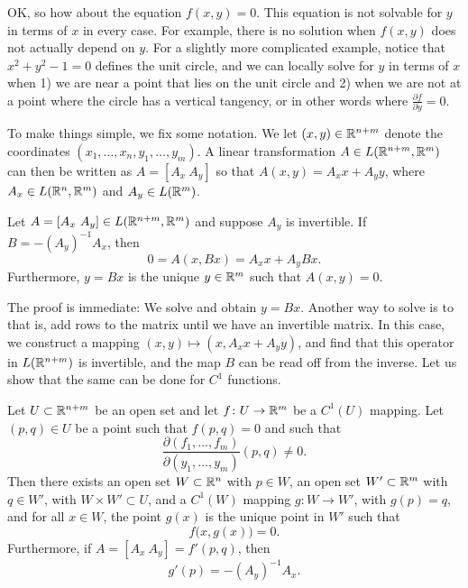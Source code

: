 OK\@, so how about the equation $f(x,y) = 0$.  This equation is
not solvable for $y$ in terms of $x$ in every case.  For example,
there is no solution
when $f(x,y)$ does not actually depend on $y$.  For a slightly more
complicated example, notice that $x^2+y^2-1 = 0$ defines the unit circle, and
we can locally solve for $y$ in terms of $x$ when 1) we are near
a point that lies on the unit circle and 2) when we are not at a point
where the circle has a vertical tangency, or in other words where
$\frac{\partial f}{\partial y} = 0$.

To make things simple, we fix some notation.  We let $(x,y) \in
{\mathbb{R}}^{n+m}$ denote the coordinates $(x_1,\ldots,x_n,y_1,\ldots,y_m)$.  A
linear transformation $A \in L({\mathbb{R}}^{n+m},{\mathbb{R}}^m)$ can then 
be written as
$A = [ A_x ~ A_y ]$ so that $A(x,y) = A_x x + A_y y$,
where $A_x \in L({\mathbb{R}}^n,{\mathbb{R}}^m)$ and
$A_y \in L({\mathbb{R}}^m)$.

\begin{prop}
Let $A = [A_x~A_y] \in L({\mathbb{R}}^{n+m},{\mathbb{R}}^m)$ and suppose 
$A_y$ is invertible.  If $B = - {(A_y)}^{-1} A_x$, then
\begin{equation*}
0 = A ( x, Bx) = A_x x + A_y Bx .
\end{equation*}
Furthermore, $y=Bx$ is the unique $y \in {\mathbb{R}}^m$ such that $A(x,y) = 0$.
\end{prop}

The proof is immediate: We solve and obtain $y = Bx$.
Another way to solve is to  that is, add
rows to the matrix until we have an invertible matrix.  In this case,
we construct a mapping $(x,y) \mapsto (x,A_x x + A_y y)$, and
find that this operator in $L({\mathbb{R}}^{n+m})$ is invertible, and the map $B$
can be read off from the inverse.
Let us show that the same can be done for $C^1$ functions.

\begin{thm}
\label{thm:implicit}
Let $U \subset {\mathbb{R}}^{n+m}$ be an open set and let $f \colon U \to {\mathbb{R}}^m$
be a $C^1(U)$ mapping.  Let $(p,q) \in U$ be a point such that
$f(p,q) = 0$ and such that
\begin{equation*}
\frac{\partial(f_1,\ldots,f_m)}{\partial(y_1,\ldots,y_m)} (p,q)  \neq 0 .
\end{equation*}
Then there exists an
open set $W \subset {\mathbb{R}}^n$ with $p \in W$,
an open set $W' \subset {\mathbb{R}}^m$ with $q \in W'$,
with $W \times W' \subset U$,
and
a $C^1(W)$ mapping $g \colon W \to W'$, with $g(p) = q$, and
for all $x \in W$, the point $g(x)$ is the unique point in $W'$
such that 
\begin{equation*}
f\bigl(x,g(x)\bigr) = 0 .
\end{equation*}
Furthermore, if $A = [ A_x ~ A_y ] = f'(p,q)$, then
\begin{equation*}
g'(p) = -{(A_y)}^{-1}A_x .
\end{equation*}
\end{thm}

